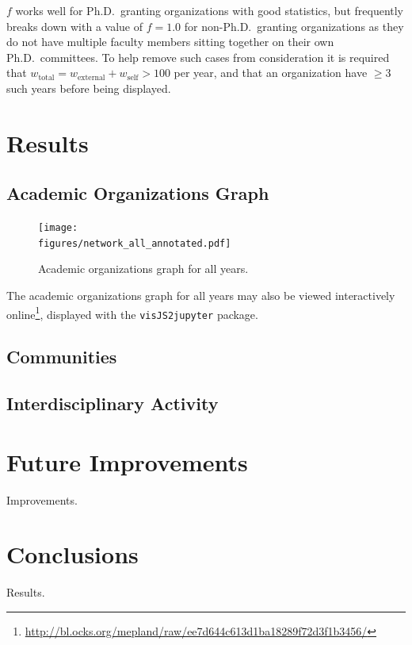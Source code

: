 \documentclass[notitlepage,aps,prd,nofootinbib]{revtex4-1}
\newcommand{\figures}{../outputs/plots}
\begin{document}
$f$ works well for Ph.D.\ granting organizations with good statistics, but frequently breaks down with a value of $f=1.0$ for non-Ph.D.\ granting organizations as they do not have multiple faculty members sitting together on their own Ph.D.\ committees. To help remove such cases from consideration it is required that $w_{\text{total}} = w_{\text{external}} + w_{\text{self}} > 100$ per year, and that an organization have $\geq 3$ such years before being displayed.


\section{Results}
\subsection{Academic Organizations Graph}
\begin{figure}[!htb]\centering
  \texttt{[image: \\figures/network\_all\_annotated.pdf]}
  \caption{Academic organizations graph for all years.}
  \label{fig:graph_all_years}
\end{figure}

The academic organizations graph for all years may also be viewed interactively online\footnote{\url{http://bl.ocks.org/mepland/raw/ee7d644c613d1ba18289f72d3f1b3456/}}, displayed with the \texttt{visJS2jupyter} \cite{visJS2jupyter} package.

\subsection{Communities}

\subsection{Interdisciplinary Activity}


\section{Future Improvements}
Improvements.

\section{Conclusions}
Results.
\end{document}
